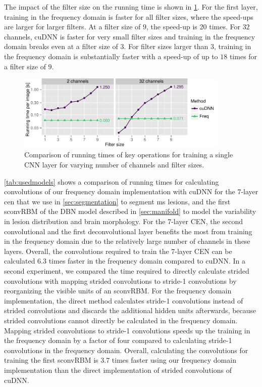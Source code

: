The impact of the filter size on the running time is shown in
\ref{fig:filtersize}. For the first layer, training in the frequency domain is
faster for all filter sizes, where the speed-ups are larger for larger filters.
At a filter size of $9$, the speed-up is 20 times. For $32$ channels, cuDNN is
faster for very small filter sizes and training in the frequency domain breaks
even at a filter size of $3$. For filter sizes larger than $3$, training in the
frequency domain is substantially faster with a speed-up of up to $18$ times for
a filter size of $9$.

\begin{figure}
\centering
\includegraphics[width=0.9\textwidth]{figures/filtersize}
\caption[Comparison of running times of key operations for training a single
CNN layer.]{Comparison of running times of key operations for training a single
CNN layer for varying number of channels and filter sizes.}
\label{fig:filtersize}
\end{figure}

\ref{tab:usedmodels} shows a comparison of running times for calculating
convolutions of our frequency domain implementation with cuDNN for the 7-layer
\gls{cen} that we use in \ref{sec:segmentation} to segment \gls{ms} lesions, and
the first sconvRBM of the DBN model described in \ref{sec:manifold} to model the
variability in lesion distribution and brain morphology. For the 7-layer CEN,
the second convolutional and the first deconvolutional layer benefits the most
from training in the frequency domain due to the relatively large number of
channels in these layers. Overall, the convolutions required to train the
7-layer CEN can be calculated 6.3 times faster in the frequency domain compared
to cuDNN. In a second experiment, we compared the time required to directly
calculate strided convolutions with mapping strided convolutions to stride-1
convolutions by reorganizing the visible units of an sconvRBM. For the frequency
domain implementation, the direct method calculates stride-1 convolutions
instead of strided convolutions and discards the additional hidden units
afterwards, because strided convolutions cannot directly be calculated in the
frequency domain. Mapping strided convolutions to stride-1 convolutions speeds
up the training in the frequency domain by a factor of four compared to
calculating stride-1 convolutions in the frequency domain. Overall, calculating
the convolutions for training the first sconvRBM is 3.7 times faster using our
frequency domain implementation than the direct implementation of strided
convolutions of cuDNN.

